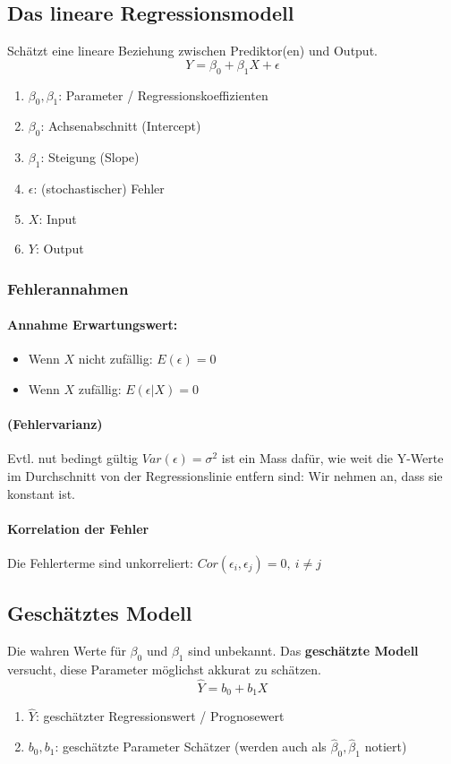 \documentclass[a3paper, 8pt]{extarticle}
\begin{document}
\begin{multicols*}{5}
\subsection{Das lineare Regressionsmodell}
Schätzt eine lineare Beziehung zwischen Prediktor(en) und Output.
\[Y=\beta_0+\beta_1X+\epsilon\]

\begin{enumerate}
    \item[] $\beta_0, \beta_1$: Parameter / Regressionskoeffizienten
    \item[] $\beta_0$: Achsenabschnitt (Intercept)
    \item[] $\beta_1$: Steigung (Slope)
    \item[] $\epsilon$: (stochastischer) Fehler
    \item[] $X$: Input
    \item[] $Y$: Output
\end{enumerate}

\subsubsection{Fehlerannahmen}

\paragraph{Annahme Erwartungswert:}\begin{itemize}
    \item Wenn $X$ nicht zufällig: $E(\epsilon) = 0$
    \item Wenn $X$ zufällig: $E(\epsilon | X)=0$
\end{itemize}

\paragraph{(Fehlervarianz)} Evtl. nut bedingt gültig $Var(\epsilon)=\sigma^2$ ist ein Mass dafür, wie weit die Y-Werte im Durchschnitt von der Regressionslinie entfern sind: Wir nehmen an, dass sie konstant ist.

\paragraph{Korrelation der Fehler} Die Fehlerterme sind unkorreliert: $Cor(\epsilon_i,\epsilon_j)=0, \: i\neq j$

\subsection{Geschätztes Modell}
Die wahren Werte für $\beta_0$ und $\beta_1$ sind unbekannt. Das \textbf{geschätzte Modell} versucht, diese Parameter möglichst akkurat zu schätzen.
\[\hat{Y}=b_0+b_1X\]
\begin{enumerate}
    \item[] $\hat{Y}$: geschätzter Regressionswert / Prognosewert
    \item[] $b_0, b_1$: geschätzte Parameter Schätzer (werden auch als $\hat{\beta}_0, \hat{\beta}_1$ notiert)
\end{enumerate}


\end{multicols*}
\end{document}
